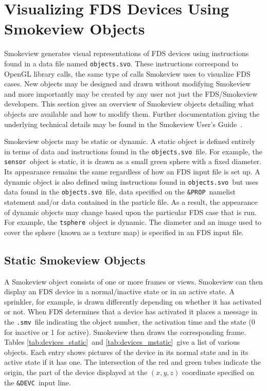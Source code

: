 %
%
\newcommand{\devicewidth}{1.5in}
\newcommand{\boxwidth}{3.0in}
\newcommand{\incgraphics}[1]{
\parbox[c]{\devicewidth}{
\vspace{0.01in}
\texttt{[image: \#1]}
\vspace{0.01in}
}
}

\section{Visualizing FDS Devices Using Smokeview Objects}
Smokeview generates visual representations of FDS devices using instructions found in a data file named
{\tt objects.svo}.  These instructions correspond to OpenGL library calls, the same type of calls Smokeview
uses to visualize FDS cases.  New objects may be designed and drawn without modifying Smokeview and more
importantly may be created by any user not just the FDS/Smokeview developers.  This section gives an overview
of Smokeview objects detailing what objects are available and how to modify them.  Further documentation
giving the underlying technical details may be found in the Smokeview User's Guide~\cite{Smokeview_Users_Guide_5}.

Smokeview objects may be static or dynamic.  A static object is defined entirely in terms of data and instructions
found in the {\tt objects.svo}\ file.  For example, the {\tt sensor}\ object is static, it is drawn as a small green
sphere with a fixed diameter.  Its appearance remains
the same regardless of how an FDS input file is set up.  A dynamic object is also defined using instructions found in
{\tt objects.svo}\ but uses data found in the {\tt objects.svo}\ file, data specified on the {\tt \&PROP}\ namelist statement and/or
data contained in the particle file.  As a result, the appearance of dynamic objects may change based upon the particular FDS case that
is run.   For example, the {\tt tsphere}\ object is dynamic.  The diameter and an image used to cover the sphere (known
as a texture map) is specified in an FDS input file.


\subsection{Static Smokeview Objects}

A Smokeview object consists of one or more frames or views.  Smokeview can then display an FDS device in a
normal/inactive state or in an active state.  A sprinkler, for example, is drawn differently depending on
whether it has activated or not.  When FDS determines that a device has activated it places a message in the
{\tt .smv}\ file indicating the object number, the activation time and the state (0 for inactive or 1 for active).
Smokeview then draws the corresponding frame.  Tables \ref{tab:devices_static}\ and \ref{tab:devices_mstatic}\
give a list of various objects.  Each entry shows pictures of the device in its normal state and
in its active state if it has one.  The intersection of the red and green tubes indicate the origin,
the part of the device displayed at the $(x,y,z)$ coordinate specified on the {\tt \&DEVC}\ input line.

